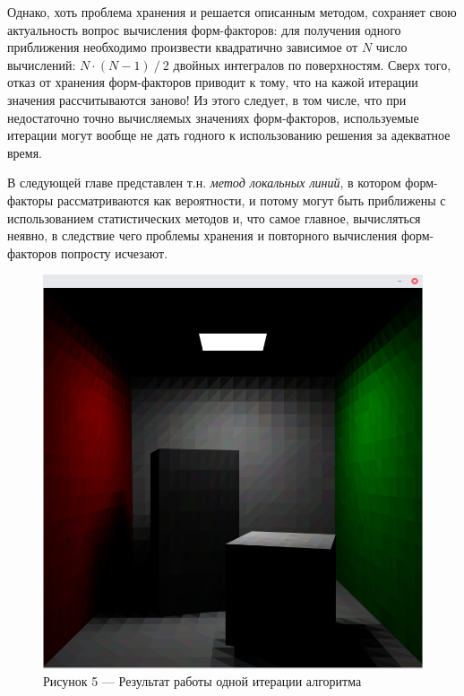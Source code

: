 \documentclass[12pt]{article}
\begin{document}
Однако, хоть проблема хранения и решается описанным методом, сохраняет свою актуальность вопрос вычисления форм-факторов: для получения одного приближения необходимо произвести квадратично зависимое от $N$ число вычислений: $N \cdot (N - 1)~/~2$ двойных интегралов по поверхностям. Сверх того, отказ от хранения форм-факторов приводит к тому, что на кажой итерации значения рассчитываются заново! Из этого следует, в том числе, что при недостаточно точно вычисляемых значениях форм-факторов, используемые итерации могут вообще не дать годного к использованию решения за адекватное время.

В следующей главе представлен т.н. \emph{метод локальных линий}, в котором форм-факторы рассматриваются как вероятности, и потому могут быть приближены с использованием статистических методов и, что самое главное, вычисляться неявно, в следствие чего проблемы хранения и повторного вычисления форм-факторов попросту исчезают. 

\begin{figure}[h]
\centering
\includegraphics[scale=0.3]{direct_only.png}
\caption*{Рисунок 5 --- Результат работы одной итерации алгоритма}
\end{figure}
\end{document}
